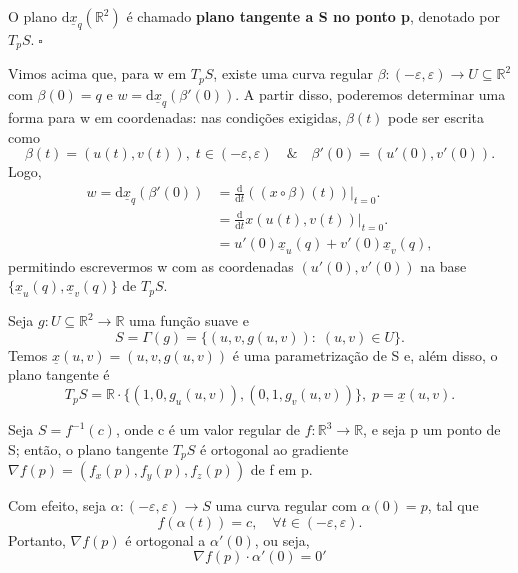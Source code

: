 \documentclass[../differential_geometry.tex]{subfiles}
\begin{document}
\begin{def*}
	O plano \(\mathrm{d}\underline{x}_{q}(\mathbb{R}^{2})\) é chamado \textbf{plano tangente a S no ponto p}, denotado por \(T_{p}S.\; \square\)
\end{def*}

Vimos acima que, para w em \(T_{p}S\), existe uma curva regular \(\beta :(-\varepsilon , \varepsilon )\rightarrow U \subseteq \mathbb{R}^{2}\) com \(\beta (0) = q\) e \(w = \mathrm{d}\underline{x}_{q}(\beta '(0))\).
A partir disso, poderemos determinar uma forma para w em coordenadas: nas condições exigidas, \(\beta (t)\) pode ser escrita como
\[
	\beta (t) = (u(t), v(t)),\; t \in (-\varepsilon , \varepsilon ) \quad\&\quad \beta '(0) = (u'(0), v'(0)).
\]
Logo,
\begin{align*}
	w = \mathrm{d}\underline{x}_{q}(\beta '(0)) & = \frac{\mathrm{d}}{\mathrm{d}t}((x\circ \beta )(t))\biggl|_{t=0}^{}\biggr. \\
	                                            & = \frac{\mathrm{d}}{\mathrm{d}t}x(u(t), v(t))\biggl|_{t=0}^{}\biggr.        \\
	                                            & = u'(0) \underline{x}_{u}(q) + v'(0) \underline{x}_{v}(q),
\end{align*}
permitindo escrevermos w com as coordenadas \((u'(0), v'(0))\) na base \(\{\underline{x}_{u}(q), \underline{x}_{v}(q)\}\) de \(T_{p}S\).

\begin{example}
	Seja \(g:U \subseteq \mathbb{R}^{2}\rightarrow \mathbb{R}\) uma função suave e
	\[
		S = \Gamma (g) = \{(u, v, g(u, v)):\; (u, v)\in U\}.
	\]
	Temos \(\underline{x}(u, v) = (u, v, g(u, v))\) é uma parametrização de S e, além disso, o plano tangente é
	\[
		T_{p}S = \mathbb{R}\cdot \{(1, 0, g_{u}(u, v)), (0, 1, g_{v}(u, v))\},\; p = \underline{x}(u, v).
	\]
\end{example}
\begin{example}
	Seja \(S = f^{-1}(c)\), onde c é um valor regular de \(f:\mathbb{R}^{3}\rightarrow \mathbb{R}\), e seja p um ponto de S; então, o plano tangente \(T_{p}S\) é ortogonal ao gradiente \(\nabla f(p) = (f_{x}(p), f_{y}(p), f_{z}(p))\) de f em p.

	Com efeito, seja \(\alpha :(-\varepsilon , \varepsilon )\rightarrow S\) uma curva regular com \(\alpha (0) = p\), tal que
	\[
		f(\alpha (t)) = c,\quad \forall t\in (-\varepsilon , \varepsilon ).
	\]
	Portanto, \(\nabla f(p)\) é ortogonal a \(\alpha '(0)\), ou seja,
	\[
		\nabla f(p)\cdot \alpha '(0) = 0'
	\]
\end{example}
\end{document}
